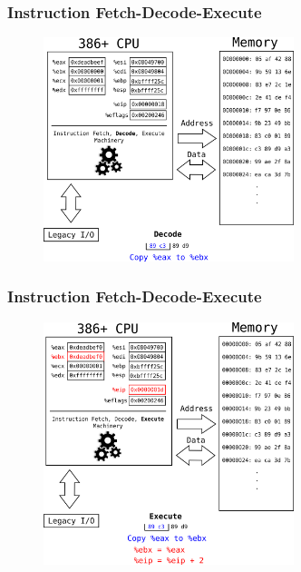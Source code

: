 \documentclass[11pt,xcolor=dvipsnames]{beamer}
\newcommand{\mvs}{\vspace{-0.95em}}
\begin{document}
\begin{frame}[fragile,t]
\frametitle{Instruction Fetch-Decode-Execute}
\mvs
\begin{figure}
\centering \includegraphics[width=0.65\textwidth]{figures/386fetch_decode_execute5.png}
\end{figure}
\end{frame}

\begin{frame}[fragile,t]
\frametitle{Instruction Fetch-Decode-Execute}
\mvs
\begin{figure}
\centering \includegraphics[width=0.65\textwidth]{figures/386fetch_decode_execute6.png}
\end{figure}
\end{frame}
\end{document}
